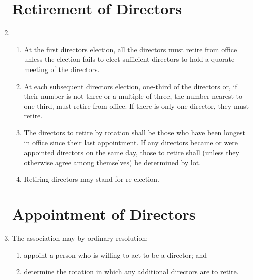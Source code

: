 \begin{enumerate}
\section{Retirement of Directors}
\item
    \begin{enumerate}
        \item At the first directors election, all the directors must retire from office unless the election
              fails to elect sufficient directors to hold a quorate meeting of the directors.
        \item At each subsequent directors election, one-third of the directors or, if their number is
              not three or a multiple of three, the number nearest to one-third, must retire from office.
              If there is only one director, they must retire.
        \item The directors to retire by rotation shall be those who have been longest in office since their
              last appointment. If any directors became or were appointed directors
              on the same day, those to retire shall (unless they otherwise agree among themselves)
              be determined by lot.
        \item Retiring directors may stand for re-election.
    \end{enumerate}

\section{Appointment of Directors}

\item
  The association may by ordinary resolution:
  \begin{enumerate}
  \item
    appoint a person who is willing to act to be a director; and
  \item
    determine the rotation in which any additional directors are to
    retire.
  \end{enumerate}


\end{enumerate}
